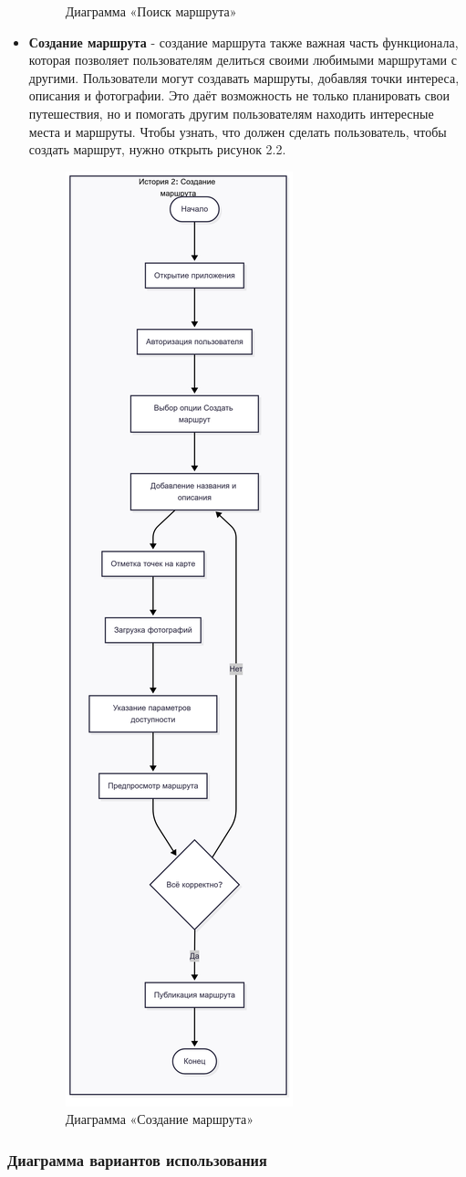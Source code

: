 \begin{itemize}
\begin{figure}[H]
        \caption{Диаграмма «Поиск маршрута»}
        \label{fig:enter-label}
    \end{figure}
    \item \textbf{Создание маршрута} - создание маршрута также важная часть функционала, которая позволяет пользователям делиться своими любимыми маршрутами с другими. Пользователи могут создавать маршруты, добавляя точки интереса, описания и фотографии. Это даёт возможность не только планировать свои путешествия, но и помогать другим пользователям находить интересные места и маршруты. Чтобы узнать, что должен сделать пользователь, чтобы создать маршрут, нужно открыть рисунок 2.2.
    \begin{figure}
        \centering
        \includegraphics[width=0.3\linewidth]{Images/mobile_logic/создание_маршрута-2025-04-13-180512.png}
        \caption{Диаграмма «Создание маршрута»}
        \label{fig:enter-label}
    \end{figure}
\end{itemize}

\subsubsection*{Диаграмма вариантов использования}

